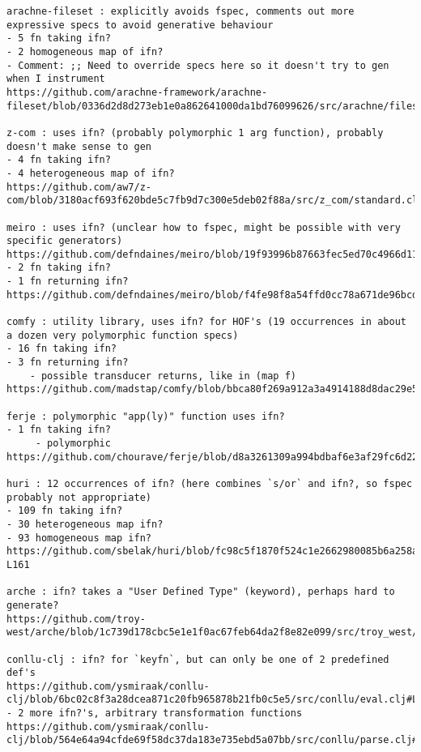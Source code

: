 \begingroup
    \fontsize{5pt}{7pt}\selectfont
\begin{verbatim}
arachne-fileset : explicitly avoids fspec, comments out more expressive specs to avoid generative behaviour
- 5 fn taking ifn?
- 2 homogeneous map of ifn?
- Comment: ;; Need to override specs here so it doesn't try to gen when I instrument
https://github.com/arachne-framework/arachne-fileset/blob/0336d2d8d273eb1e0a862641000da1bd76099626/src/arachne/fileset/specs.clj#L7

z-com : uses ifn? (probably polymorphic 1 arg function), probably doesn't make sense to gen
- 4 fn taking ifn?
- 4 heterogeneous map of ifn?
https://github.com/aw7/z-com/blob/3180acf693f620bde5c7fb9d7c300e5deb02f88a/src/z_com/standard.cljs#L18

meiro : uses ifn? (unclear how to fspec, might be possible with very specific generators)
https://github.com/defndaines/meiro/blob/19f93996b87663fec5ed70c4966d114aa4855d6b/src/meiro/backtracker.clj#L17
- 2 fn taking ifn?
- 1 fn returning ifn?
https://github.com/defndaines/meiro/blob/f4fe98f8a54ffd0cc78a671de96bcd9727904c0c/src/meiro/core.clj#L201

comfy : utility library, uses ifn? for HOF's (19 occurrences in about a dozen very polymorphic function specs)
- 16 fn taking ifn?
- 3 fn returning ifn?
	- possible transducer returns, like in (map f)
https://github.com/madstap/comfy/blob/bbca80f269a912a3a4914188d8dac29e5edaca0b/src/madstap/comfy.cljc

ferje : polymorphic "app(ly)" function uses ifn?
- 1 fn taking ifn?
	 - polymorphic
https://github.com/chourave/ferje/blob/d8a3261309a994bdbaf6e3af29fc6d22c3e51844/src/ferje/util.clj#L33

huri : 12 occurrences of ifn? (here combines `s/or` and ifn?, so fspec probably not appropriate)
- 109 fn taking ifn?
- 30 heterogeneous map ifn?
- 93 homogeneous map ifn?
https://github.com/sbelak/huri/blob/fc98c5f1870f524c1e2662980085b6a258abd5cf/src/huri/core.clj#L159-L161

arche : ifn? takes a "User Defined Type" (keyword), perhaps hard to generate?
https://github.com/troy-west/arche/blob/1c739d178cbc5e1e1f0ac67feb64da2f8e82e099/src/troy_west/arche/spec.clj#L36

conllu-clj : ifn? for `keyfn`, but can only be one of 2 predefined def's
https://github.com/ysmiraak/conllu-clj/blob/6bc02c8f3a28dcea871c20fb965878b21fb0c5e5/src/conllu/eval.clj#L19
- 2 more ifn?'s, arbitrary transformation functions
https://github.com/ysmiraak/conllu-clj/blob/564e64a94cfde69f58dc37da183e735ebd5a07bb/src/conllu/parse.clj#L42


\end{verbatim}
